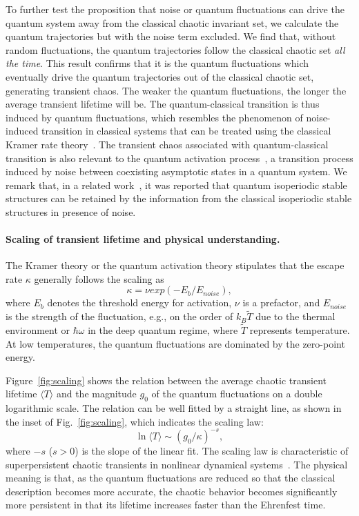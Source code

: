 \documentclass[12pt]{wlscirep}
\begin{document}
To further test the proposition that noise or quantum fluctuations can drive
the quantum system away from the classical chaotic invariant set, we calculate  
the quantum trajectories but with the noise term excluded. We find that, without
random fluctuations, the quantum trajectories follow the classical chaotic 
set {\em all the time}. This result confirms that it is the quantum 
fluctuations which eventually drive the quantum trajectories out of the
classical chaotic set, generating transient chaos. The weaker the quantum
fluctuations, the longer the average transient lifetime will be. The 
quantum-classical transition is thus induced by quantum fluctuations,
which resembles the phenomenon of noise-induced transition in classical
systems that can be treated using the classical Kramer rate 
theory~\cite{HTB:1990}. The transient chaos associated with 
quantum-classical transition is also relevant to the quantum activation 
process~\cite{Dykman:2007}, a transition process induced by noise between
coexisting asymptotic states in a quantum system. 
We remark that, in a related work~\cite{C:2012}, it was reported that
quantum isoperiodic stable structures can be retained by the information 
from the classical isoperiodic stable structures in presence of noise.

\paragraph*{Scaling of transient lifetime and physical understanding.}
The Kramer theory or the quantum activation theory stipulates that the 
escape rate $\kappa$ generally follows the scaling as 
\begin{displaymath}
\kappa = \nu exp(-E_b/E_{noise}), 
\end{displaymath}
where $E_b$ denotes the threshold energy for activation, $\nu$ is a 
prefactor, and $E_{noise}$ is the strength of the fluctuation, e.g.,
on the order of $k_B\tilde{T}$ due to the thermal environment or
$\hbar\omega$ in the deep quantum regime, where $\tilde{T}$ represents 
temperature. At low temperatures, the quantum fluctuations are dominated 
by the zero-point energy.

Figure~\ref{fig:scaling} shows the relation between the average chaotic 
transient lifetime $\langle T\rangle$ and the magnitude $g_0$ of the 
quantum fluctuations on a double logarithmic scale. The relation can be 
well fitted by a straight line, as shown in the inset of 
Fig.~\ref{fig:scaling}, which indicates the scaling law:
\begin{equation} \label{eq:scaling}
\ln{\langle T\rangle} \sim (g_0/\kappa)^{-s},
\end{equation}
where $-s$ ($s>0$) is the slope of the linear fit. The scaling law is 
characteristic of superpersistent chaotic transients in nonlinear 
dynamical systems~\cite{GOY:1983,GOY:1985,CK:1988,LW:1995,DL:2003}.
The physical meaning is that, as the quantum fluctuations are reduced
so that the classical description becomes more accurate, the chaotic 
behavior becomes significantly more persistent in that its lifetime 
increases faster than the Ehrenfest time. 
\end{document}
